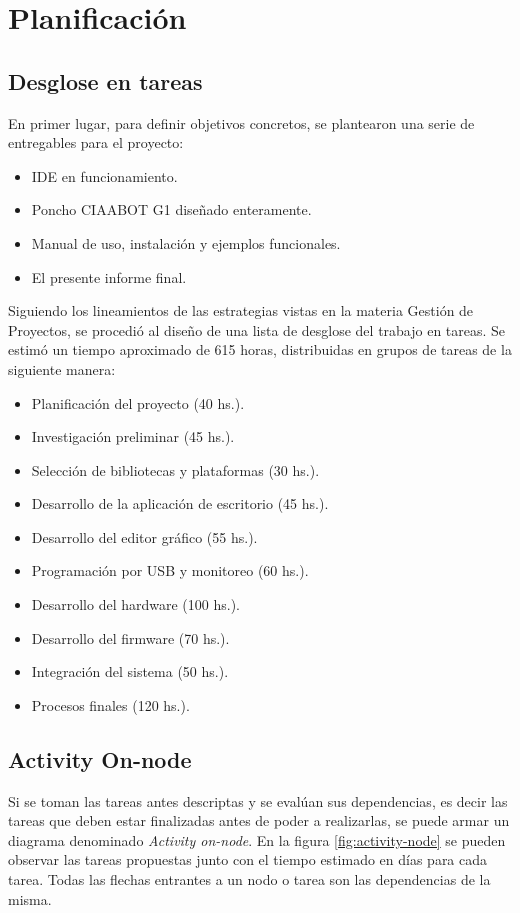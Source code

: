 \section{Planificación}
\label{sec:planificacion}
\subsection{Desglose en tareas}
En primer lugar, para definir objetivos concretos, se plantearon una serie de entregables para el proyecto:

\begin{itemize}
\item IDE en funcionamiento.
\item Poncho CIAABOT G1 diseñado enteramente.
\item Manual de uso, instalación y ejemplos funcionales.
\item El presente informe final.
\end{itemize}

Siguiendo los lineamientos de las estrategias vistas en la materia Gestión de Proyectos, se procedió al diseño de una lista de desglose del trabajo en tareas. Se estimó un tiempo aproximado de 615 horas, distribuidas en grupos de tareas de la siguiente manera:

\begin{itemize}
\item Planificación del proyecto (40 hs.).
\item Investigación preliminar (45 hs.).
\item Selección de bibliotecas y plataformas (30 hs.).
\item Desarrollo de la aplicación de escritorio (45 hs.).
\item Desarrollo del editor gráfico (55 hs.).
\item Programación por USB y monitoreo (60 hs.).
\item Desarrollo del hardware (100 hs.).
\item Desarrollo del firmware (70 hs.).
\item Integración del sistema (50 hs.).
\item Procesos finales (120 hs.).
\end{itemize}

\subsection{Activity On-node}
Si se toman las tareas antes descriptas y se evalúan sus dependencias, es decir las tareas que deben estar finalizadas antes de poder a realizarlas, se puede armar un diagrama denominado \emph{Activity on-node}. En la figura \ref{fig:activity-node} se pueden observar las tareas propuestas junto con el tiempo estimado en días para cada tarea. Todas las flechas entrantes a un nodo o tarea son las dependencias de la misma.

